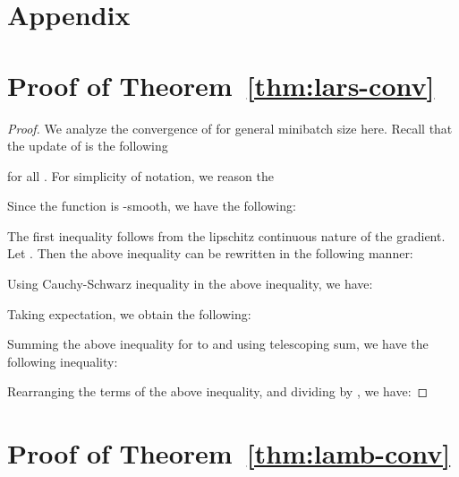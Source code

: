 \documentclass{article} \usepackage{iclr2020_conference,times}
\begin{document}



\appendix
\section*{Appendix}

\section{Proof of Theorem~\ref{thm:lars-conv}}

\begin{proof}
We analyze the convergence of  for general minibatch size here. Recall that the update of   is the following

for all . For simplicity of notation, we reason the 

Since the function  is -smooth, we have the following:

The first inequality follows from the lipschitz continuous nature of the gradient. Let . Then the above inequality can be rewritten in the following manner:


Using Cauchy-Schwarz inequality in the above inequality, we have:


Taking expectation, we obtain the following:

Summing the above inequality for  to  and using telescoping sum, we have the following inequality:
 
Rearranging the terms of the above inequality, and dividing by , we have:


\end{proof}

\section{Proof of Theorem~\ref{thm:lamb-conv}}
\end{document}
